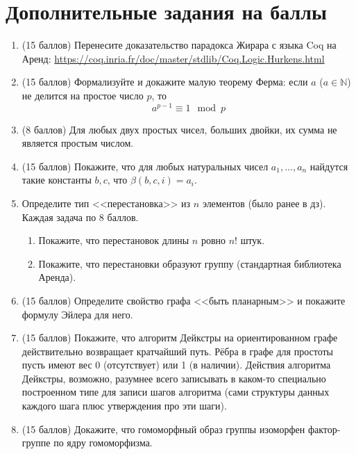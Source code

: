 \documentclass[10pt,a4paper,oneside]{article}
\begin{document}
\section*{Дополнительные задания на баллы}
\begin{enumerate}
\item (15 баллов) Перенесите доказательство парадокса Жирара с языка Coq на Аренд:
\url{https://coq.inria.fr/doc/master/stdlib/Coq.Logic.Hurkens.html}

\item (15 баллов) 
Формализуйте и докажите малую теорему Ферма: если $a$ ($a \in \mathbb{N}$) не делится на простое число $p$,
то $$a^{p-1} \equiv 1 \mod p$$ 

\item (8 баллов) Для любых двух простых чисел, больших двойки, их сумма не является простым числом.

\item (15 баллов) Покажите, что для любых натуральных чисел $a_1,\dots,a_n$ найдутся такие константы $b,c$, что $\beta(b,c,i) = a_i$.

\item Определите тип <<перестановка>> из $n$ элементов (было ранее в дз). Каждая задача по 8 баллов.
\begin{enumerate}
\item Покажите, что перестановок длины $n$ ровно $n!$ штук.
\item Покажите, что перестановки образуют группу (стандартная библиотека Аренда).
\end{enumerate}

\item (15 баллов) Определите свойство графа <<быть планарным>> и покажите формулу Эйлера для него.

\item (15 баллов) Покажите, что алгоритм Дейкстры на ориентированном графе действительно возвращает кратчайший путь. Рёбра в графе для простоты
пусть имеют вес 0 (отсутствует) или 1 (в наличии). Действия алгоритма Дейкстры, возможно, разумнее всего записывать в каком-то специально
построенном типе для записи шагов алгоритма (сами структуры данных каждого шага плюс утверждения про эти шаги).

\item (15 баллов) Докажите, что гомоморфный образ группы изоморфен фактор-группе по ядру гомоморфизма.

\end{enumerate}
\end{document}
